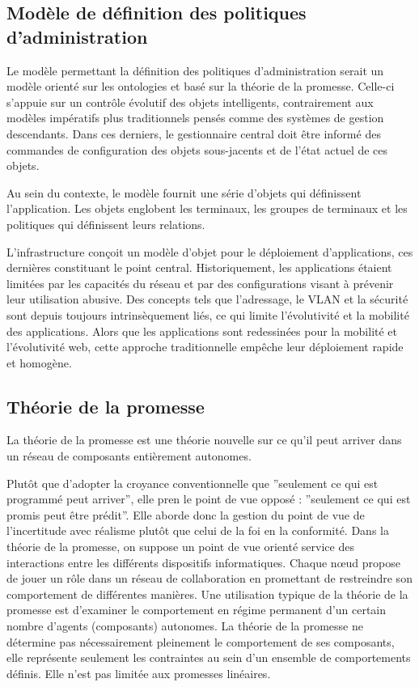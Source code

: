 \subsection{Modèle de définition des politiques d'administration}

Le modèle permettant la définition des politiques d'administration serait un
modèle orienté sur les ontologies et basé sur la théorie de la promesse.
Celle-ci s'appuie sur un contrôle évolutif des objets intelligents,
contrairement aux modèles impératifs plus traditionnels pensés comme des
systèmes de gestion descendants. Dans ces derniers, le gestionnaire central
doit être informé des commandes de configuration des objets sous-jacents et de
l'état actuel de ces objets.

Au sein du contexte, le modèle fournit une série d'objets qui définissent
l'application. Les objets englobent les terminaux, les groupes de terminaux et
les politiques qui définissent leurs relations.

L'infrastructure conçoit un modèle d'objet pour le déploiement d'applications,
ces dernières constituant le point central. Historiquement, les applications
étaient limitées par les capacités du réseau et par des configurations visant à
prévenir leur utilisation abusive. Des concepts tels que l'adressage, le VLAN et
la sécurité sont depuis toujours intrinsèquement liés, ce qui limite
l'évolutivité et la mobilité des applications. Alors que les applications sont
redessinées pour la mobilité et l'évolutivité web, cette approche traditionnelle
empêche leur déploiement rapide et homogène.

\subsection{Théorie de la promesse}

La théorie de la promesse est une théorie nouvelle sur ce qu'il peut arriver
dans un réseau de composants entièrement autonomes.

Plutôt que d'adopter la croyance conventionnelle que ''seulement ce qui est
programmé peut arriver'', elle pren le point de vue opposé : ''seulement ce
qui est promis peut être prédit''. Elle aborde donc la gestion du point de vue
de l'incertitude avec réalisme plutôt que celui de la foi en la conformité. Dans
la théorie de la promesse, on suppose un point de vue orienté service des
interactions entre les différents dispositifs informatiques. Chaque nœud propose
de jouer un rôle dans un réseau de collaboration en promettant de restreindre
son comportement de différentes manières. Une utilisation typique de la théorie
de la promesse est d'examiner le comportement en régime permanent d'un certain
nombre d'agents (composants) autonomes. La théorie de la promesse ne détermine
pas nécessairement pleinement le comportement de ses composants, elle représente
seulement les contraintes au sein d'un ensemble de comportements définis. Elle
n'est pas limitée aux promesses linéaires.

